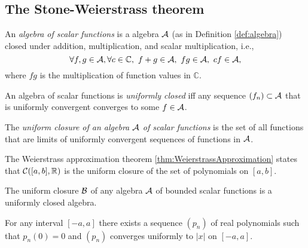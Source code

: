 \subsection{The Stone-Weierstrass theorem}

\begin{defn}
  \label{def:algebraOfFuncs}
  An \emph{algebra of scalar functions} %
  is a algebra ${\cal A}$ (as in Definition \ref{def:algebra})
  closed under addition, multiplication,
  and scalar multiplication, i.e.,
  \begin{equation}
    \label{eq:algebraOfFuncs}
    \forall f,g\in {\cal A}, \forall c\in\mathbb{C},\
    f+g\in{\cal A},\ fg\in {\cal A},\ cf\in{\cal A},
  \end{equation}
  where $fg$ is the multiplication of function values in $\mathbb{C}$.
\end{defn}

\begin{defn}
  \label{def:uniformClosedness}
  An algebra of scalar functions is \emph{uniformly closed}
  iff
  any sequence $(f_n)\subset {\cal A}$
  that is uniformly convergent
  converges to some $f\in {\cal A}$.
\end{defn}

\begin{defn}
  \label{def:uniformClosure}
  The \emph{uniform closure of an algebra ${\cal A}$ of scalar functions}
  is the set of all functions that are limits
  of uniformly convergent sequences of functions in ${\cal A}$.
\end{defn}

\begin{exm}
  The Weierstrass approximation theorem \ref{thm:WeierstrassApproximation}
  states that ${\cal C}([a,b],\mathbb{R})$
  is the uniform closure of the set of polynomials on $[a,b]$.
\end{exm}

\begin{lem}
  \label{lem:uniformClosureIsClosed}
  The uniform closure ${\cal B}$ of any algebra ${\cal A}$
  of bounded scalar functions is a uniformly closed algebra. 
\end{lem}

\begin{lem}
  \label{lem:polyConvergesToAbsX}
  For any interval $[-a,a]$
  there exists a sequence $(p_n)$ of real polynomials
  such that $p_n(0)=0$ and
  $(p_n)$ converges uniformly to $|x|$ on $[-a,a]$. 
\end{lem}

